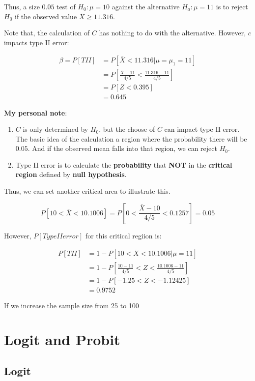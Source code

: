 \documentclass[]{book}
\begin{document}
Thus, a size \(0.05\) test of \(H_0: \mu=10\) against the alternative \(H_a:\mu=11\) is to reject \(H_0\) if the observed value \(\bar{X} \geq 11.316\).

Note that, the calculation of \(C\) has nothing to do with the alternative. However, \(c\) impacts type II error:

\[\begin{aligned} \beta=P[TII] &=P[\bar{X}<11.316 |\mu=\mu_1=11] \\ &=P[\frac{\bar{X}-11}{4/5}<\frac{11.316-11}{4/5}] \\ &=P[Z <0.395] \\ &=0.645 \end{aligned}\]

\textbf{My personal note}:

\begin{enumerate}
\def\labelenumi{(\arabic{enumi})}
\item
  \(C\) is only determined by \(H_0\), but the choose of \(C\) can impact type II error. The basic idea of the calculation a region where the probability there will be \(0.05\). And if the observed mean falls into that region, we can reject \(H_0\).
\item
  Type II error is to calculate the \textbf{probability} that \textbf{NOT} in the \textbf{critical region} defined by \textbf{null hypothesis}.
\end{enumerate}

Thus, we can set another critical area to illustrate this.

\[P[10 < \bar{X}<10.1006]=P[0 <\frac{\bar{X}-10}{4/5} <0.1257]=0.05\]

However, \(P[Type II error]\) for this critical regiion is:

\[\begin{aligned} P[TII] &=1-P[10<\bar{X}<10.1006|\mu=11] \\ &=1-P[\frac{10-11}{4/5}<Z<\frac{10.1006-11}{4/5}] \\ &=1-P[-1.25 <Z<-1.12425] \\ &=0.9752 \end{aligned}\]

If we increase the sample size from 25 to 100

\hypertarget{logit-and-probit}{%
\chapter{Logit and Probit}\label{logit-and-probit}}

\hypertarget{logit}{%
\section{Logit}\label{logit}}
\end{document}
